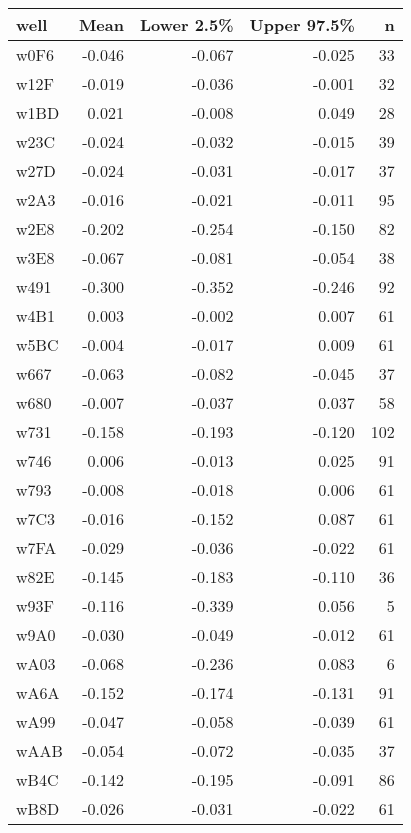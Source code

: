 \begin{table}[ht]
\centering
\begingroup\fontsize{11pt}{11pt}\selectfont
\begin{tabular}{lrrrr}
  \hline
well & Mean & Lower 2.5\% & Upper 97.5\% & n \\ 
  \hline
w0F6 & -0.046 & -0.067 & -0.025 &   33 \\ 
  w12F & -0.019 & -0.036 & -0.001 &   32 \\ 
  w1BD & 0.021 & -0.008 & 0.049 &   28 \\ 
  w23C & -0.024 & -0.032 & -0.015 &   39 \\ 
  w27D & -0.024 & -0.031 & -0.017 &   37 \\ 
  w2A3 & -0.016 & -0.021 & -0.011 &   95 \\ 
  w2E8 & -0.202 & -0.254 & -0.150 &   82 \\ 
  w3E8 & -0.067 & -0.081 & -0.054 &   38 \\ 
  w491 & -0.300 & -0.352 & -0.246 &   92 \\ 
  w4B1 & 0.003 & -0.002 & 0.007 &   61 \\ 
  w5BC & -0.004 & -0.017 & 0.009 &   61 \\ 
  w667 & -0.063 & -0.082 & -0.045 &   37 \\ 
  w680 & -0.007 & -0.037 & 0.037 &   58 \\ 
  w731 & -0.158 & -0.193 & -0.120 &  102 \\ 
  w746 & 0.006 & -0.013 & 0.025 &   91 \\ 
  w793 & -0.008 & -0.018 & 0.006 &   61 \\ 
  w7C3 & -0.016 & -0.152 & 0.087 &   61 \\ 
  w7FA & -0.029 & -0.036 & -0.022 &   61 \\ 
  w82E & -0.145 & -0.183 & -0.110 &   36 \\ 
  w93F & -0.116 & -0.339 & 0.056 &    5 \\ 
  w9A0 & -0.030 & -0.049 & -0.012 &   61 \\ 
  wA03 & -0.068 & -0.236 & 0.083 &    6 \\ 
  wA6A & -0.152 & -0.174 & -0.131 &   91 \\ 
  wA99 & -0.047 & -0.058 & -0.039 &   61 \\ 
  wAAB & -0.054 & -0.072 & -0.035 &   37 \\ 
  wB4C & -0.142 & -0.195 & -0.091 &   86 \\ 
  wB8D & -0.026 & -0.031 & -0.022 &   61 \\ 

\end{tabular}
\end{table}
